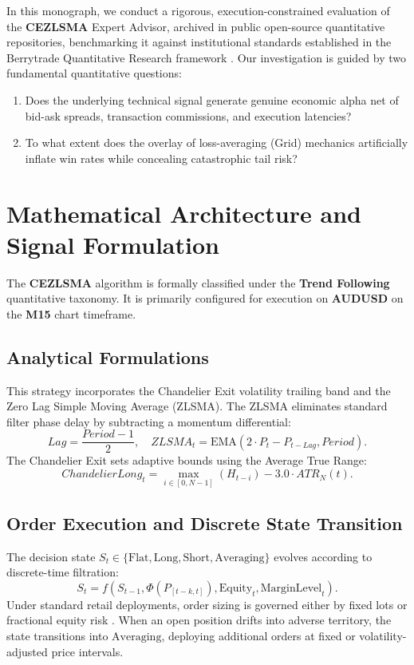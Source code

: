 \documentclass[11pt,a4paper]{article}
\begin{document}
In this monograph, we conduct a rigorous, execution-constrained evaluation of the \textbf{CEZLSMA} Expert Advisor, archived in public open-source quantitative repositories, benchmarking it against institutional standards established in the Berrytrade Quantitative Research framework \cite{artsu2026illusion}. Our investigation is guided by two fundamental quantitative questions:
\begin{enumerate}
    \item Does the underlying technical signal generate genuine economic alpha net of bid-ask spreads, transaction commissions, and execution latencies?
    \item To what extent does the overlay of loss-averaging (Grid) mechanics artificially inflate win rates while concealing catastrophic tail risk?
\end{enumerate}

\section{Mathematical Architecture and Signal Formulation}
The \textbf{CEZLSMA} algorithm is formally classified under the \textbf{Trend Following} quantitative taxonomy. It is primarily configured for execution on \textbf{AUDUSD} on the \textbf{M15} chart timeframe.

\subsection{Analytical Formulations}

This strategy incorporates the Chandelier Exit volatility trailing band and the Zero Lag Simple Moving Average (ZLSMA).
The ZLSMA eliminates standard filter phase delay by subtracting a momentum differential:
\begin{equation}
Lag = \frac{Period - 1}{2}, \quad ZLSMA_t = \text{EMA}\left(2 \cdot P_t - P_{t-Lag}, Period\right).
\end{equation}
The Chandelier Exit sets adaptive bounds using the Average True Range:
\begin{equation}
ChandelierLong_t = \max_{i \in [0, N-1]} (H_{t-i}) - 3.0 \cdot ATR_N(t).
\end{equation}


\subsection{Order Execution and Discrete State Transition}
The decision state $S_t \in \{\text{Flat}, \text{Long}, \text{Short}, \text{Averaging}\}$ evolves according to discrete-time filtration:
\begin{equation}
S_{t} = f(S_{t-1}, \Phi(P_{[t-k, t]}), \text{Equity}_t, \text{MarginLevel}_t).
\end{equation}
Under standard retail deployments, order sizing is governed either by fixed lots or fractional equity risk \cite{lopez2018advances, carhart1997persistence}. When an open position drifts into adverse territory, the state transitions into $\text{Averaging}$, deploying additional orders at fixed or volatility-adjusted price intervals.
\end{document}
